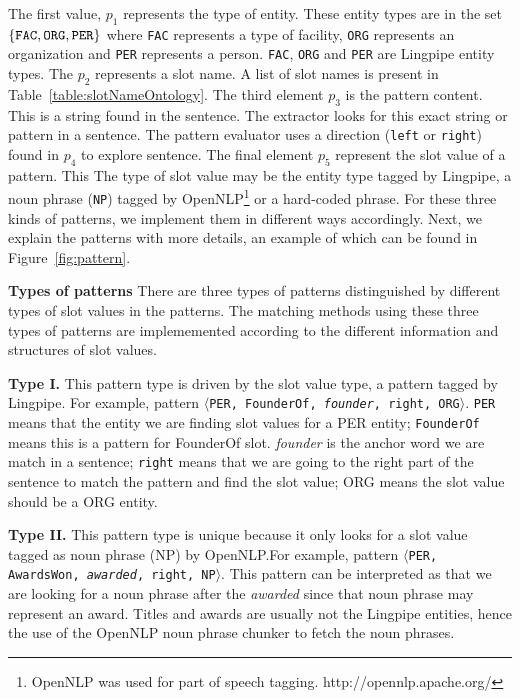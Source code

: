 The first value, $p_1$ represents the type of entity. These entity types are in the set $\{ \text{\tt FAC}, \text{\tt ORG}, \text{\tt PER} \}$ where \texttt{FAC} represents a type of facility, \texttt{ORG} represents an organization and \texttt{PER} represents a person. \texttt{FAC}, \texttt{ORG} and \texttt{PER} are Lingpipe entity types. The $p_2$ represents a slot name. A list of slot names is present in Table~\ref{table:slotNameOntology}. The third element $p_3$ is the pattern content. This is a string found in the sentence. The extractor looks for this exact string or pattern in a sentence. The pattern evaluator uses a direction (\texttt{left} or \texttt{right}) found in $p_4$ to explore sentence. The final element $p_5$ represent the slot value of a pattern. This %
The type of slot value may be the entity type tagged by Lingpipe, a noun phrase (\texttt{NP}) tagged by OpenNLP\footnote{OpenNLP was used for part of speech tagging. http://opennlp.apache.org/‎} or a hard-coded phrase. For these three kinds of patterns, we implement them in different 
ways accordingly. Next, we explain the patterns with more details, an example of which can be found in Figure~\ref{fig:pattern}. 

\textbf{Types of patterns}
There are three types of patterns distinguished by different types of slot values in the patterns. The matching methods using these three types of patterns are implememented according to the different information and structures of slot values.

 
\textbf{Type I.} This pattern type is driven by the slot value type, a pattern tagged by Lingpipe. For example, pattern $\langle$\texttt{PER, FounderOf, \textit{founder}, right, ORG}$\rangle$. \texttt{PER} means 
that the entity we are finding slot values for a PER entity; \texttt{FounderOf} means this is a pattern for FounderOf slot. \textit{founder} is the anchor word we are match in a sentence; \texttt{right} means that we are going to the right part of the sentence to match the pattern and find the slot value; ORG means the slot value should be a ORG entity.

\textbf{Type II.} This pattern type is unique because it only looks for a slot value tagged as noun phrase (NP) by OpenNLP.\@ For example, pattern $\langle$\texttt{PER, AwardsWon, \textit{awarded}, right, NP}$\rangle$. This pattern can be interpreted as that we are looking for a noun phrase after the \textit{awarded} since that noun phrase may represent an award. Titles and awards are usually not the Lingpipe entities, hence the use of the OpenNLP noun phrase chunker to fetch the noun phrases.

